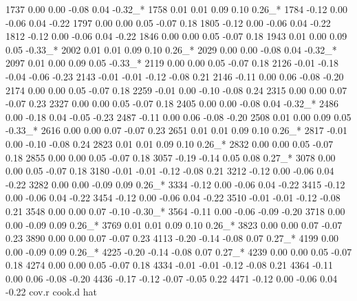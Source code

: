 \begin{Schunk}
\begin{Soutput}
1737  0.00     0.00    -0.08     0.04    -0.32_*
1758  0.01     0.01     0.09     0.10     0.26_*
1784 -0.12     0.00    -0.06     0.04    -0.22  
1797  0.00     0.00     0.05    -0.07     0.18  
1805 -0.12     0.00    -0.06     0.04    -0.22  
1812 -0.12     0.00    -0.06     0.04    -0.22  
1846  0.00     0.00     0.05    -0.07     0.18  
1943  0.01     0.00     0.09     0.05    -0.33_*
2002  0.01     0.01     0.09     0.10     0.26_*
2029  0.00     0.00    -0.08     0.04    -0.32_*
2097  0.01     0.00     0.09     0.05    -0.33_*
2119  0.00     0.00     0.05    -0.07     0.18  
2126 -0.01    -0.18    -0.04    -0.06    -0.23  
2143 -0.01    -0.01    -0.12    -0.08     0.21  
2146 -0.11     0.00     0.06    -0.08    -0.20  
2174  0.00     0.00     0.05    -0.07     0.18  
2259 -0.01     0.00    -0.10    -0.08     0.24  
2315  0.00     0.00     0.07    -0.07     0.23  
2327  0.00     0.00     0.05    -0.07     0.18  
2405  0.00     0.00    -0.08     0.04    -0.32_*
2486  0.00    -0.18     0.04    -0.05    -0.23  
2487 -0.11     0.00     0.06    -0.08    -0.20  
2508  0.01     0.00     0.09     0.05    -0.33_*
2616  0.00     0.00     0.07    -0.07     0.23  
2651  0.01     0.01     0.09     0.10     0.26_*
2817 -0.01     0.00    -0.10    -0.08     0.24  
2823  0.01     0.01     0.09     0.10     0.26_*
2832  0.00     0.00     0.05    -0.07     0.18  
2855  0.00     0.00     0.05    -0.07     0.18  
3057 -0.19    -0.14     0.05     0.08     0.27_*
3078  0.00     0.00     0.05    -0.07     0.18  
3180 -0.01    -0.01    -0.12    -0.08     0.21  
3212 -0.12     0.00    -0.06     0.04    -0.22  
3282  0.00     0.00    -0.09     0.09     0.26_*
3334 -0.12     0.00    -0.06     0.04    -0.22  
3415 -0.12     0.00    -0.06     0.04    -0.22  
3454 -0.12     0.00    -0.06     0.04    -0.22  
3510 -0.01    -0.01    -0.12    -0.08     0.21  
3548  0.00     0.00     0.07    -0.10    -0.30_*
3564 -0.11     0.00    -0.06    -0.09    -0.20  
3718  0.00     0.00    -0.09     0.09     0.26_*
3769  0.01     0.01     0.09     0.10     0.26_*
3823  0.00     0.00     0.07    -0.07     0.23  
3890  0.00     0.00     0.07    -0.07     0.23  
4113 -0.20    -0.14    -0.08     0.07     0.27_*
4199  0.00     0.00    -0.09     0.09     0.26_*
4225 -0.20    -0.14    -0.08     0.07     0.27_*
4239  0.00     0.00     0.05    -0.07     0.18  
4274  0.00     0.00     0.05    -0.07     0.18  
4334 -0.01    -0.01    -0.12    -0.08     0.21  
4364 -0.11     0.00     0.06    -0.08    -0.20  
4436 -0.17    -0.12    -0.07    -0.05     0.22  
4471 -0.12     0.00    -0.06     0.04    -0.22  
     cov.r   cook.d hat  

\end{Soutput}
\end{Schunk}
